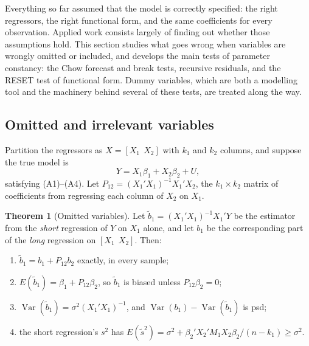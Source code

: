 \documentclass[11pt,a4paper]{article}
\numberwithin{equation}{section}
\DeclareMathOperator{\Var}{Var}
\theoremstyle{definition}
\newtheorem{thm}{Theorem}[subsection]
\begin{document}
Everything so far assumed that the model is correctly specified: the right regressors, the right functional form, and the same coefficients for
every observation. Applied work consists largely of finding out whether those assumptions hold. This section studies what goes wrong when
variables are wrongly omitted or included, and develops the main tests of parameter constancy: the Chow forecast and break tests, recursive
residuals, and the RESET test of functional form. Dummy variables, which are both a modelling tool and the machinery behind several of these
tests, are treated along the way.

\subsection{Omitted and irrelevant variables}
\label{ssec:omitted}

Partition the regressors as $X = [X_1\ \ X_2]$ with $k_1$ and $k_2$ columns, and suppose the true model is
\[
Y = X_1\beta_1 + X_2\beta_2 + U ,
\]
satisfying (A1)--(A4). Let $P_{12} = (X_1'X_1)^{-1}X_1'X_2$, the $k_1 \times k_2$ matrix of coefficients from regressing each column of $X_2$ on $X_1$.

\begin{thm}[Omitted variables]
\label{thm:ovb}
Let $\tilde b_1 = (X_1'X_1)^{-1}X_1'Y$ be the estimator from the \emph{short} regression of $Y$ on $X_1$ alone, and let $b_1$ be the corresponding part
of the \emph{long} regression on $[X_1\ \ X_2]$. Then:
\begin{enumerate}[label=(\roman*)]
\item $\tilde b_1 = b_1 + P_{12}b_2$ exactly, in every sample;
\item $E(\tilde b_1) = \beta_1 + P_{12}\beta_2$, so $\tilde b_1$ is biased unless $P_{12}\beta_2 = 0$;
\item $\Var(\tilde b_1) = \sigma^2(X_1'X_1)^{-1}$, and $\Var(b_1) - \Var(\tilde b_1)$ is psd;
\item the short regression's $s^2$ has $E(\tilde s^2) = \sigma^2 + \beta_2'X_2'M_1X_2\beta_2/(n - k_1) \geq \sigma^2$.
\end{enumerate}
\end{thm}
\end{document}
